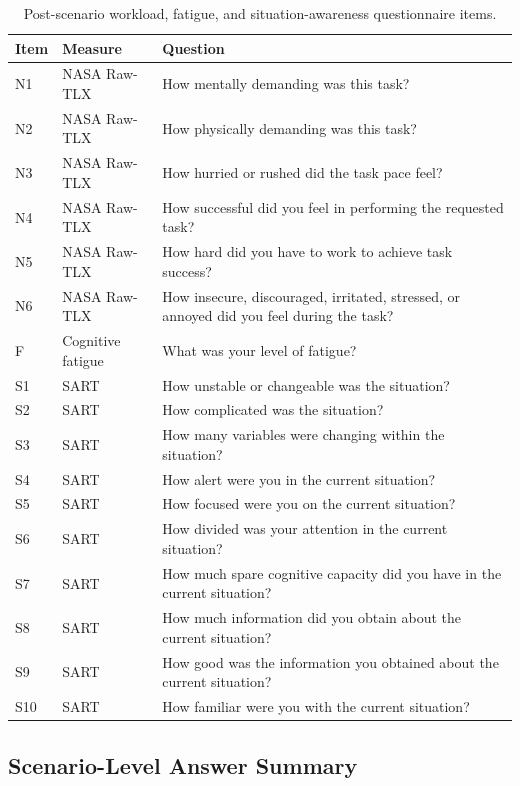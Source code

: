 \begin{table}[t]
\centering
\caption{Post-scenario workload, fatigue, and situation-awareness questionnaire items.}
\label{tab:app_workload_sart_questions}
\scriptsize
\setlength{\tabcolsep}{4pt}
\begin{tabularx}{\textwidth}{p{}p{}X}
\toprule
\textbf{Item} & \textbf{Measure} & \textbf{Question} \\
\midrule
N1 & NASA Raw-TLX & How mentally demanding was this task? \\
N2 & NASA Raw-TLX & How physically demanding was this task? \\
N3 & NASA Raw-TLX & How hurried or rushed did the task pace feel? \\
N4 & NASA Raw-TLX & How successful did you feel in performing the requested task? \\
N5 & NASA Raw-TLX & How hard did you have to work to achieve task success? \\
N6 & NASA Raw-TLX & How insecure, discouraged, irritated, stressed, or annoyed did you feel during the task? \\
F & Cognitive fatigue & What was your level of fatigue? \\
S1 & SART & How unstable or changeable was the situation? \\
S2 & SART & How complicated was the situation? \\
S3 & SART & How many variables were changing within the situation? \\
S4 & SART & How alert were you in the current situation? \\
S5 & SART & How focused were you on the current situation? \\
S6 & SART & How divided was your attention in the current situation? \\
S7 & SART & How much spare cognitive capacity did you have in the current situation? \\
S8 & SART & How much information did you obtain about the current situation? \\
S9 & SART & How good was the information you obtained about the current situation? \\
S10 & SART & How familiar were you with the current situation? \\
\bottomrule
\end{tabularx}
\end{table}

\subsection{Scenario-Level Answer Summary}~\label{appx:user_answer_summary}

